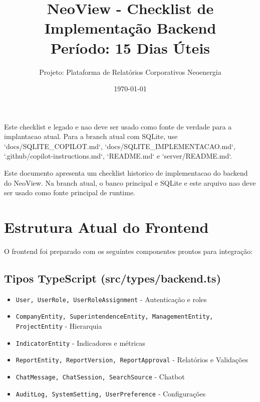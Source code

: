 \documentclass[12pt,a4paper]{article}
\title{\textbf{NeoView - Checklist de Implementação Backend}\\
\large Período: 15 Dias Úteis}
\author{Projeto: Plataforma de Relatórios Corporativos Neoenergia}
\date{\today}
\newcommand{\checkbox}{$\square$}
\begin{document}
\begin{tcolorbox}[colback=red!5!white,colframe=red,title=\textbf{Documento Historico}]
Este checklist e legado e nao deve ser usado como fonte de verdade para a implantacao atual.
Para a branch atual com SQLite, use `docs/SQLITE_COPILOT.md`, `docs/SQLITE_IMPLEMENTACAO.md`, `.github/copilot-instructions.md`, `README.md` e `server/README.md`.
\end{tcolorbox}

\maketitle

\begin{tcolorbox}[colback=blue!5!white,colframe=neoblue,title=\textbf{Visão Geral}]
Este documento apresenta um checklist historico de implementacao do backend do NeoView. Na branch atual, o banco principal e SQLite e este arquivo nao deve ser usado como fonte principal de runtime.
\end{tcolorbox}

\section{Estrutura Atual do Frontend}

O frontend foi preparado com os seguintes componentes prontos para integração:

\subsection{Tipos TypeScript (src/types/backend.ts)}
\begin{itemize}[label=\checkbox]
    \item \texttt{User, UserRole, UserRoleAssignment} - Autenticação e roles
    \item \texttt{CompanyEntity, SuperintendenceEntity, ManagementEntity, ProjectEntity} - Hierarquia
    \item \texttt{IndicatorEntity} - Indicadores e métricas
    \item \texttt{ReportEntity, ReportVersion, ReportApproval} - Relatórios e Validações
    \item \texttt{ChatMessage, ChatSession, SearchSource} - Chatbot
    \item \texttt{AuditLog, SystemSetting, UserPreference} - Configurações
\end{itemize}
\end{document}
